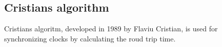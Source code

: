 \subsection{Cristians algorithm}
Cristians algoritm, developed in 1989 by Flaviu Cristian, is used for synchronizing clocks by calculating the roud trip time. 

